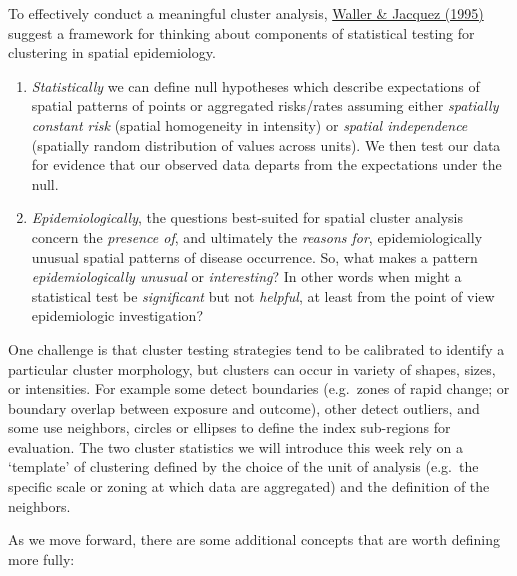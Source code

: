 \documentclass[
]{book}
\begin{document}
To effectively conduct a meaningful cluster analysis, \href{https://journals.lww.com/epidem/Abstract/1995/11000/Disease_Models_Implicit_in_Statistical_Tests_of.4.aspx}{Waller \& Jacquez (1995)} suggest a framework for thinking about components of statistical testing for clustering in spatial epidemiology.

\begin{enumerate}
\def\labelenumi{\arabic{enumi}.}
\item
  \emph{Statistically} we can define null hypotheses which describe expectations of spatial patterns of points or aggregated risks/rates assuming either \emph{spatially constant risk} (spatial homogeneity in intensity) or \emph{spatial independence} (spatially random distribution of values across units). We then test our data for evidence that our observed data departs from the expectations under the null.
\item
  \emph{Epidemiologically}, the questions best-suited for spatial cluster analysis concern the \emph{presence of}, and ultimately the \emph{reasons for}, epidemiologically unusual spatial patterns of disease occurrence. So, what makes a pattern \emph{epidemiologically unusual} or \emph{interesting}? In other words when might a statistical test be \emph{significant} but not \emph{helpful}, at least from the point of view epidemiologic investigation?
\end{enumerate}

One challenge is that cluster testing strategies tend to be calibrated to identify a particular cluster morphology, but clusters can occur in variety of shapes, sizes, or intensities. For example some detect boundaries (e.g.~zones of rapid change; or boundary overlap between exposure and outcome), other detect outliers, and some use neighbors, circles or ellipses to define the index sub-regions for evaluation. The two cluster statistics we will introduce this week rely on a `template' of clustering defined by the choice of the unit of analysis (e.g.~the specific scale or zoning at which data are aggregated) and the definition of the neighbors.

As we move forward, there are some additional concepts that are worth defining more fully:
\end{document}
